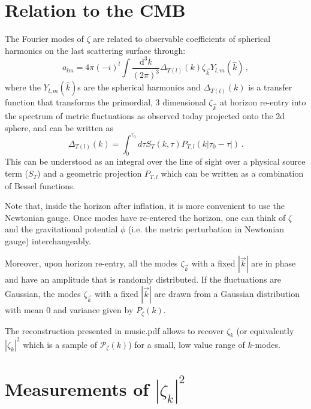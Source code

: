 \documentclass[prd, onecolumn, floatfix, letterpaper, nofootinbib, amsmath, amssymb, superscriptaddress]{revtex4}
\renewcommand{\(}{\left(}
\renewcommand{\)}{\right)}
\renewcommand{\[}{\left[}
\renewcommand{\]}{\right]}
\def\be{\begin{equation}}
\def\ee{\end{equation}}
\begin{document}
\section{Relation to the CMB}

The Fourier modes of $\zeta$ are related to observable coefficients of spherical harmonics on the last scattering surface through:
\be
	a_{lm}=4\pi (-i)^l\int \frac{\mathrm{d}^3k}{(2\pi)^3} \Delta_{T(l)}(k)\zeta_{\vec{k}}Y_{l,m}(\hat{k})\, ,
\ee
where the  $Y_{l,m}(\hat{k})$s are the spherical harmonics and $\Delta_{T(l)}(k)$ is a transfer function that transforms the primordial, 3 dimensional $\zeta_{\vec{k}}$ at horizon re-entry into the spectrum of metric fluctuations as observed today projected onto the 2d sphere, and can be written as
\be
	\Delta_{T(l)}(k)=\int_0^{\tau_0} d\tau S_T(k, \tau)P_{T, l}(k\left|\tau_0-\tau\right|)\,.
\ee 
This can be understood as an integral over the line of sight over a physical source term ($S_T$) and a geometric projection $P_{T,l}$ which can be written as a combination of Bessel functions.

Note that, inside the horizon after inflation, it is more convenient to use the Newtonian gauge. Once modes have re-entered the horizon, one can think of $\zeta$ and the gravitational potential $\phi$ (i.e. the metric perturbation in Newtonian gauge) interchangeably.

Moreover, upon horizon re-entry, all the modes $\zeta_{\vec{k}}$ with a fixed $|\vec{k}|$ are in phase and have an amplitude that is randomly distributed. If the fluctuations are Gaussian, the modes  $\zeta_{\vec{k}}$ with a fixed $|\vec{k}|$ are drawn from a Gaussian distribution with mean 0 and variance given by $P_\zeta(k)$. 

The reconstruction presented in music.pdf allows to recover $\zeta_k$ (or equivalently $\left| \zeta_k\right|^2$ which is a sample of $\mathcal{P}_\zeta(k)$) for a small, low value range of $k$-modes.  
 
 
 
 \section{Measurements of $|\zeta_k|^2$}
 
\end{document}
